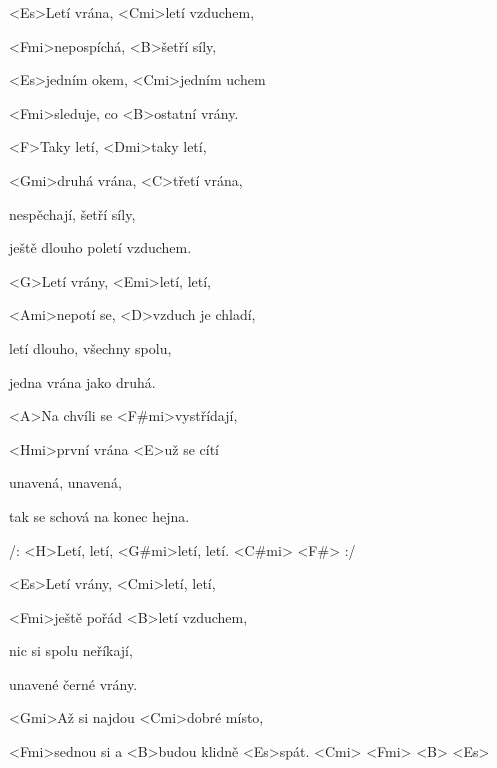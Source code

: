 

\zs
<Es>Letí vrána, <Cmi>letí vzduchem,

<Fmi>nepospíchá, <B>šetří síly,

<Es>jedním okem, <Cmi>jedním uchem

<Fmi>sleduje, co <B>ostatní vrány.
\ks

\zs
<F>Taky letí, <Dmi>taky letí,

<Gmi>druhá vrána, <C>třetí vrána,

nespěchají, šetří síly,

ještě dlouho poletí vzduchem.
\ks

\zs
<G>Letí vrány, <Emi>letí, letí,

<Ami>nepotí se, <D>vzduch je chladí,

letí dlouho, všechny spolu,

jedna vrána jako druhá.
\ks

\zs
<A>Na chvíli se <F#mi>vystřídají,

<Hmi>první vrána <E>už se cítí

unavená, unavená,

tak se schová na konec hejna.
\ks

\zr
/: <H>Letí, letí, <G#mi>letí, letí. <C#mi> <F#> :/
\kr

\zs
<Es>Letí vrány, <Cmi>letí, letí,

<Fmi>ještě pořád <B>letí vzduchem,

nic si spolu neříkají,

unavené černé vrány.
\ks

\zr
<Gmi>Až si najdou <Cmi>dobré místo,

<Fmi>sednou si a <B>budou klidně <Es>spát. <Cmi>
<Fmi> <B> <Es>
\kr

\kp
